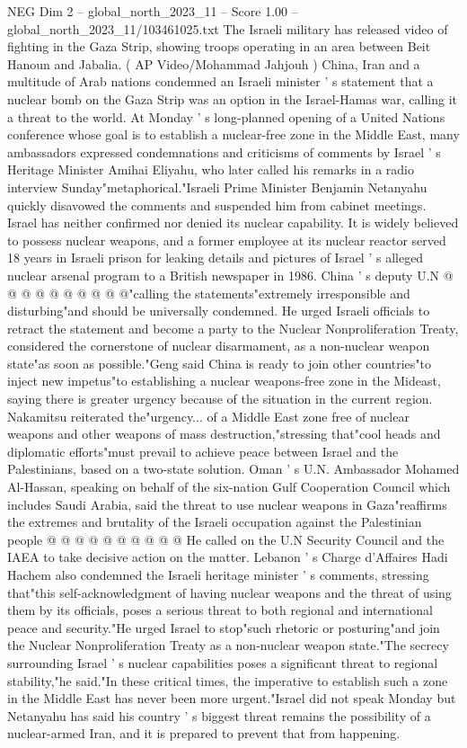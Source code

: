 \begin{textsample}{NEG Dim 2 – global\_north\_2023\_11 – Score 1.00 – global\_north\_2023\_11/103461025.txt}  \label{ex:f2_neg_218}
The Israeli military has released video of fighting in the Gaza Strip, showing troops operating in an area between Beit Hanoun and Jabalia. ( AP Video/Mohammad Jahjouh ) China, Iran and a multitude of Arab nations condemned an Israeli minister ' s statement that a nuclear bomb on the Gaza Strip was an option in the Israel-Hamas war, calling it a threat to the world.
At Monday ' s long-planned opening of a United Nations conference whose goal is to establish a nuclear-free zone in the Middle East, many ambassadors expressed condemnations and criticisms of comments by Israel ' s Heritage Minister Amihai Eliyahu, who later called his remarks in a radio interview Sunday"metaphorical."Israeli Prime Minister Benjamin Netanyahu quickly disavowed the comments and suspended him from cabinet meetings.
Israel has neither confirmed nor denied its nuclear capability.
It is widely believed to possess nuclear weapons, and a former employee at its nuclear reactor served 18 years in Israeli prison for leaking details and pictures of Israel ' s alleged nuclear arsenal program to a British newspaper in 1986.
China ' s deputy U.N @ @ @ @ @ @ @ @ @ @"calling the statements"extremely irresponsible and disturbing"and should be universally condemned.
He urged Israeli officials to retract the statement and become a party to the Nuclear Nonproliferation Treaty, considered the cornerstone of nuclear disarmament, as a non-nuclear weapon state"as soon as possible."Geng said China is ready to join other countries"to inject new impetus"to establishing a nuclear weapons-free zone in the Mideast, saying there is greater urgency because of the situation in the current region.
Nakamitsu reiterated the"urgency... of a Middle East zone free of nuclear weapons and other weapons of mass destruction,"stressing that"cool heads and diplomatic efforts"must prevail to achieve peace between Israel and the Palestinians, based on a two-state solution.
Oman ' s U.N.
Ambassador Mohamed Al-Hassan, speaking on behalf of the six-nation Gulf Cooperation Council which includes Saudi Arabia, said the threat to use nuclear weapons in Gaza"reaffirms the extremes and brutality of the Israeli occupation against the Palestinian people @ @ @ @ @ @ @ @ @ @ He called on the U.N Security Council and the IAEA to take decisive action on the matter.
Lebanon ' s Charge d'Affaires Hadi Hachem also condemned the Israeli heritage minister ' s comments, stressing that"this self-acknowledgment of having nuclear weapons and the threat of using them by its officials, poses a serious threat to both regional and international peace and security."He urged Israel to stop"such rhetoric or posturing"and join the Nuclear Nonproliferation Treaty as a non-nuclear weapon state."The secrecy surrounding Israel ' s nuclear capabilities poses a significant threat to regional stability,"he said."In these critical times, the imperative to establish such a zone in the Middle East has never been more urgent."Israel did not speak Monday but Netanyahu has said his country ' s biggest threat remains the possibility of a nuclear-armed Iran, and it is prepared to prevent that from happening.

\end{textsample}
